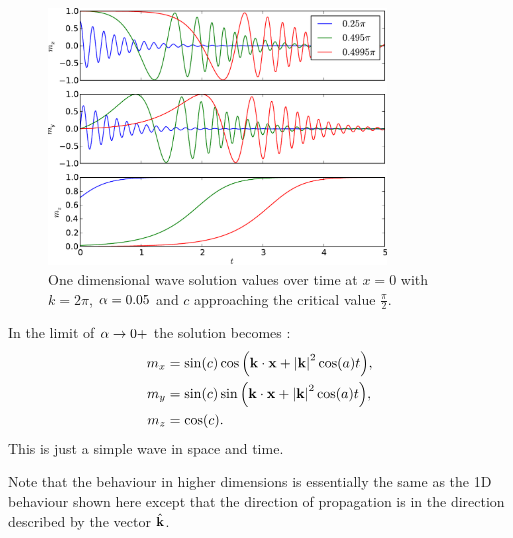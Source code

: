 \begin{figure}
  \centering
  \includegraphics[width=0.8\textwidth]{plots/wave_exact_solution_parameters/exact_solution_parameters_complex.pdf}
  \caption{One dimensional wave solution values over time at $x=0$ with $k = 2\pi$, $\alpha = 0.05$ and $c$ approaching the critical value $\frac{\pi}{2}$.}
  \label{fig:wave-solution-vary-c-complex}
\end{figure}


In the limit of $\alpha \rightarrow 0+$ the solution becomes \cite{Fuwa2006}:
\begin{equation}
  \begin{aligned}
    m_x &= \sin(c) \cos{\left( \boldsymbol{\mathrm{k}}\cdot \boldsymbol{\mathrm{x}}+ \left|{\boldsymbol{\mathrm{k}}} \right|^2 \cos(a) t \right)}, \\
    m_y &= \sin(c) \sin{\left( \boldsymbol{\mathrm{k}}\cdot \boldsymbol{\mathrm{x}}+ \left|{\boldsymbol{\mathrm{k}}} \right|^2 \cos(a) t \right)}, \\
    m_z &= \cos(c).
  \end{aligned}
\end{equation}
This is just a simple wave in space and time.

Note that the behaviour in higher dimensions is essentially the same as the 1D behaviour shown here except that the direction of propagation is in the direction described by the vector ${\hat{\mathbf{k}}}$.






